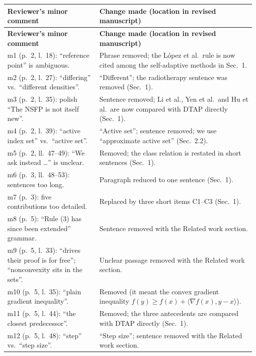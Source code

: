 \documentclass[11pt]{article}
\begin{document}
\medskip
{\footnotesize
\setlength{\tabcolsep}{5pt}
\renewcommand{\arraystretch}{1.25}
\begin{longtable}{@{}>{\raggedright\arraybackslash}p{}
>{\raggedright\arraybackslash}p{}@{}}
\toprule
\textbf{Reviewer's minor comment} & \textbf{Change made (location in revised manuscript)}\\
\midrule
\endfirsthead
\toprule
\textbf{Reviewer's minor comment} & \textbf{Change made (location in revised manuscript)}\\
\midrule
\endhead
\bottomrule
\endfoot
m1 (p.~2, l.~18): ``reference point'' is ambiguous. & Phrase removed; the L\'opez et al.\ rule is now cited among the self-adaptive methods in Sec.~1.\\
m2 (p.~2, l.~27): ``differing'' vs.\ ``different densities''. & ``Different''; the radiotherapy sentence was removed (Sec.~1).\\
m3 (p.~2, l.~35): polish ``The NSFP is not itself new''. & Sentence removed; Li et al., Yen et al.\ and Hu et al.\ are now compared with DTAP directly (Sec.~1).\\
m4 (p.~2, l.~39): ``active index set'' vs.\ ``active set''. & ``Active set''; sentence removed; we use ``approximate active set'' (Sec.~2.2).\\
m5 (p.~2, ll.~47--49): ``We ask instead \dots'' is unclear. & Removed; the class relation is restated in short sentences (Sec.~1).\\
m6 (p.~3, ll.~48--53): sentences too long. & Paragraph reduced to one sentence (Sec.~1).\\
m7 (p.~3): five contributions too detailed. & Replaced by three short items C1--C3 (Sec.~1).\\
m8 (p.~5): ``Rule (3) has since been extended'' grammar. & Sentence removed with the Related work section.\\
m9 (p.~5, l.~33): ``drives their proof is for free''; ``nonconvexity sits in the sets''. & Unclear passage removed with the Related work section.\\
m10 (p.~5, l.~35): ``plain gradient inequality''. & Removed (it meant the convex gradient inequality $f(y)\ge f(x)+\langle\nabla f(x),y-x\rangle$).\\
m11 (p.~5, l.~44): ``the closest predecessor''. & Removed; the three antecedents are compared with DTAP directly (Sec.~1).\\
m12 (p.~5, l.~48): ``step'' vs.\ ``step size''. & ``Step size''; sentence removed with the Related work section.\\

\end{longtable}}
\end{document}
